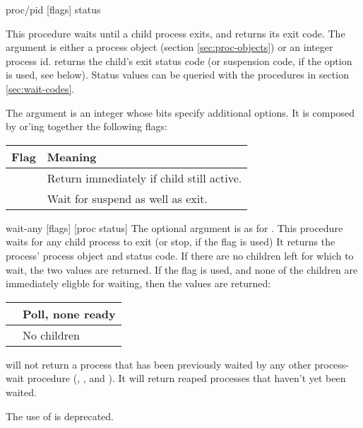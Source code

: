    {proc/pid [flags]}  {status}
\begin{desc}
    This procedure waits until a child process exits, and returns its
    exit code. The  argument is either a process object
    (section \ref{sec:proc-objects}) or an integer process id.
     returns the child's exit status code (or suspension code,
    if the  option is used, see below).
    Status values can be queried with the procedures in section 
    \ref{sec:wait-codes}.

    The  argument is an integer whose bits specify
    additional options. It is composed by or'ing together the following
    flags:
        \begin{center}
        \begin{tabular}{|l|l|}
        \hline
        Flag                    & Meaning                           \\ \hline \hline
        \ex{wait/poll}          & Return {\sharpf} immediately if
                                  child still active.               \\ \hline
        \ex{wait/stopped-children}      & Wait for suspend as well as exit. \\ \hline
        \end{tabular}
        \end{center}
\end{desc}

\begin{defundesc} {wait-any} {[flags]} {[proc status]}
    The optional  argument is as for .
    This procedure waits for any child process to exit (or stop, if the
         flag is used)
    It returns the process' process object and status code.
    If there are no children left for which to wait, the two values
        \ex{[{\sharpf} {\sharpt}]} are returned.
    If the  flag is used, and none of the children
        are immediately eligble for waiting, 
        then the values \ex{[{\sharpf} {\sharpf}]} are returned:
        \begin{center}
        \begin{tabular}{|l|l|}
        \hline
        [{\sharpf} {\sharpf}] & Poll, none ready \\ \hline
        [{\sharpf} {\sharpt}] & No children      \\ \hline
        \end{tabular}
        \end{center}

     will not return a process that has been previously waited
    by any other process-wait procedure (, ,
    and ).
    It will return reaped processes that haven't yet been waited.

    The use of  is deprecated.
\end{defundesc}

